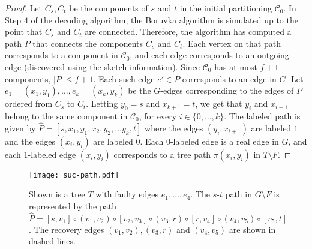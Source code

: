 \begin{proof}
Let $C_s, C_t$ be the components of $s$ and $t$ in the initial partitioning $\mathcal{C}_0$. In Step $4$ of the decoding algorithm, the Boruvka algorithm is simulated up to the point that $C_s$ and $C_t$ are connected. Therefore, the algorithm has computed a path $P$ that connects the components $C_s$ and $C_t$. Each vertex on that path corresponds to a component in $\mathcal{C}_0$, and each edge corresponds to an outgoing edge (discovered using the sketch information). Since $\mathcal{C}_0$ has at most $f+1$ components, $|P|\leq f+1$. 
Each such edge $e' \in P$ corresponds to an edge in $G$. Let $e_1=(x_1,y_1),\ldots, e_k=(x_k,y_k)$ be the $G$-edges corresponding to the edges of $P$ ordered from $C_s$ to $C_t$. Letting $y_0=s$ and $x_{k+1}=t$, we get that 
$y_i$ and $x_{i+1}$ belong to the same component in $\mathcal{C}_0$, for every $i \in \{0,\ldots, k\}$. 
The labeled path is given by $\widehat{P}=[s, x_1,y_1, x_2, y_2, \ldots y_k,t]$ where the edges $(y_i,x_{i+1})$ are labeled $1$ and the edges $(x_{i}, y_i)$ are labeled $0$. Each $0$-labeled edge is a real edge in $G$, and each $1$-labeled edge $(x_{i}, y_i)$ corresponds to a tree path $\pi(x_i, y_i)$ in $T \setminus F$. 
\end{proof}


\begin{figure}[h!]
\begin{center}
\texttt{[image: suc-path.pdf]}
\caption{\sf Shown is a tree $T$ with faulty edges $e_1,\ldots, e_4$. The $s$-$t$ path in $G \setminus F$ is represented by the path $\widehat{P}=[s,v_1]\circ (v_1,v_2) \circ [v_2,v_3] \circ (v_3,r) \circ [r,v_4] \circ (v_4, v_5) \circ [v_5,t]$. The recovery edges $(v_1,v_2), (v_3,r)$ and $(v_4, v_5)$ are shown in dashed lines.  \label{fig:succ-paths}
}
\end{center}
\end{figure}